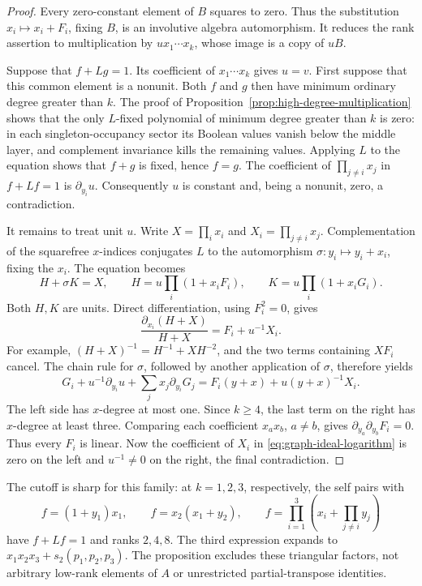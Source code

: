 \begin{proof}
Every zero-constant element of \(B\) squares to zero. Thus the
substitution \(x_i\mapsto x_i+F_i\), fixing \(B\), is an involutive
algebra automorphism. It reduces the rank assertion to multiplication
by \(u x_1\cdots x_k\), whose image is a copy of \(uB\).

Suppose that \(f+Lg=1\). Its coefficient of \(x_1\cdots x_k\)
gives \(u=v\). First suppose that this common element is a nonunit.
Both \(f\) and \(g\) then have minimum ordinary degree greater than
\(k\). The proof of Proposition~\ref{prop:high-degree-multiplication}
shows that the only \(L\)-fixed polynomial of minimum degree greater
than \(k\) is zero: in each singleton-occupancy sector its Boolean
values vanish below the middle layer, and complement invariance kills
the remaining values. Applying \(L\) to the equation shows that
\(f+g\) is fixed, hence \(f=g\). The coefficient of
\(\prod_{j\ne i}x_j\) in \(f+Lf=1\) is \(\partial_{y_i}u\).
Consequently \(u\) is constant and, being a nonunit, zero, a contradiction.

It remains to treat unit \(u\). Write \(X=\prod_i x_i\) and
\(X_i=\prod_{j\ne i}x_j\). Complementation of the squarefree
\(x\)-indices conjugates \(L\) to the automorphism
\(\sigma:y_i\mapsto y_i+x_i\), fixing the \(x_i\). The equation becomes
\[
 H+\sigma K=X,\qquad
 H=u\prod_i(1+x_iF_i),\qquad K=u\prod_i(1+x_iG_i).
\]
Both \(H,K\) are units. Direct differentiation, using \(F_i^2=0\), gives
\[
 \frac{\partial_{x_i}(H+X)}{H+X}=F_i+u^{-1}X_i.
\]
For example, \((H+X)^{-1}=H^{-1}+XH^{-2}\), and the two terms
containing \(XF_i\) cancel. The chain rule for \(\sigma\), followed
by another application of \(\sigma\), therefore yields
\begin{equation}\label{eq:graph-ideal-logarithm}
 G_i+u^{-1}\partial_{y_i}u
       +\sum_jx_j\partial_{y_i}G_j
 =F_i(y+x)+u(y+x)^{-1}X_i.
\end{equation}
The left side has \(x\)-degree at most one. Since \(k\geq4\), the
last term on the right has \(x\)-degree at least three. Comparing
each coefficient \(x_ax_b\), \(a\ne b\), gives
\(\partial_{y_a}\partial_{y_b}F_i=0\). Thus every \(F_i\) is linear.
Now the coefficient of \(X_i\) in \eqref{eq:graph-ideal-logarithm}
is zero on the left and \(u^{-1}\ne0\) on the right, the final
contradiction.
\end{proof}

The cutoff is sharp for this family: at \(k=1,2,3\), respectively,
the self pairs with
\[
 f=(1+y_1)x_1,\qquad
 f=x_2(x_1+y_2),\qquad
 f=\prod_{i=1}^3\left(x_i+\prod_{j\ne i}y_j\right)
\]
have \(f+Lf=1\) and ranks \(2,4,8\). The third expression expands to
\(x_1x_2x_3+s_2(p_1,p_2,p_3)\).
The proposition excludes these triangular factors, not arbitrary
low-rank elements of \(A\) or unrestricted partial-transpose identities.

